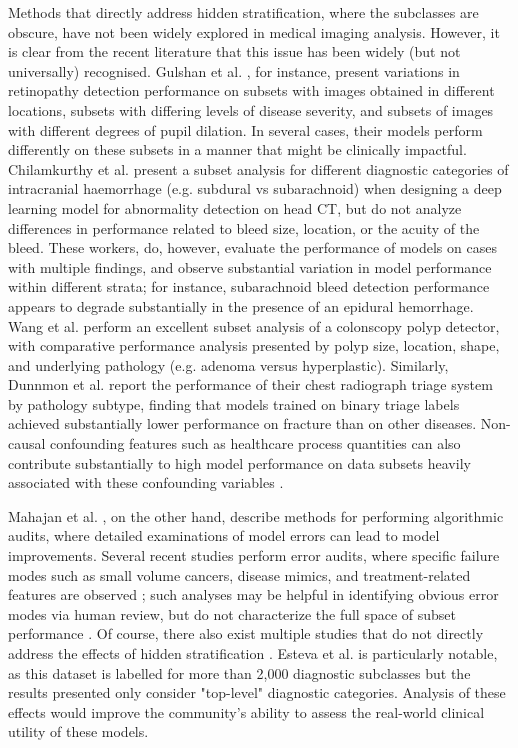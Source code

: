 \documentclass{article}
\begin{document}
Methods that directly address hidden stratification, where the subclasses are obscure, have not been widely explored in medical imaging analysis.  However, it is clear from the recent literature that this issue has been widely (but not universally) recognised.  
Gulshan et al. \citep{Gulshan2016-we}, for instance, present variations in retinopathy detection performance on subsets with images obtained in different locations, subsets with differing levels of disease severity, and subsets of images with different degrees of pupil dilation.  
In several cases, their models perform differently on these subsets in a manner that might be clinically impactful.  
Chilamkurthy et al. \citep{Chilamkurthy2018-op}  present a subset analysis for different diagnostic categories of intracranial haemorrhage (e.g. subdural vs subarachnoid) when designing a deep learning model for abnormality detection on head CT, but do not analyze differences in  performance related to bleed size, location, or the acuity of the bleed. 
 These workers, do, however, evaluate the performance of models on cases with multiple findings, and observe substantial variation in model performance within different strata; for instance, subarachnoid bleed detection performance appears to degrade substantially in the presence of an epidural hemorrhage.  
Wang et al. \citep{Wang2019-jr} perform an excellent subset analysis of a colonscopy polyp detector, with comparative performance analysis presented by polyp size, location, shape, and underlying pathology (e.g. adenoma versus hyperplastic).  
 Similarly, Dunnmon et al. \citep{Dunnmon2019-rr} report the performance of their chest radiograph triage system by pathology subtype, finding that models trained on binary triage labels achieved substantially lower performance on fracture than on other diseases.   
Non-causal confounding features such as healthcare process quantities can also contribute substantially to high model performance on data subsets heavily associated with these confounding variables \citep{Winkler2019-fw, Badgeley2019-zi, Agniel2018-qp, Zech2018-xq}.

Mahajan et al. \citep{Mahajan2019-yi}, on the other hand, describe methods for performing algorithmic audits, where detailed examinations of model errors can lead to model improvements.
 Several recent studies perform error audits, where specific failure modes such as small volume cancers, disease mimics, and treatment-related features are observed \citep{Campanella2019-qs, Wang2019-jr}; such analyses may be helpful in identifying obvious error modes via human review, but do not characterize the full space of subset performance \citep{Selbst2017-gz}.  
 Of course, there also exist multiple studies that do not directly address the effects of hidden stratification \citep{Haenssle2018-vw, Bien2018-ae}. 
 Esteva et al. \citep{Esteva2017-if} is particularly notable, as this dataset is labelled for more than 2,000 diagnostic subclasses but the results presented only consider "top-level" diagnostic categories. 
 Analysis of these effects would improve the community's ability to assess the real-world clinical utility of these models. 
 
\end{document}
